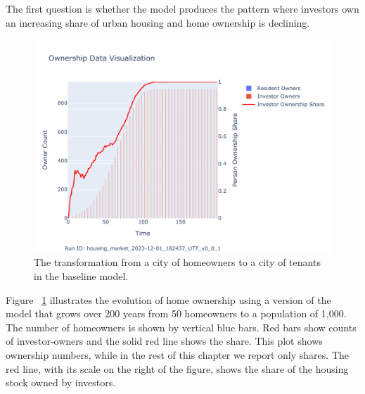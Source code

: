
The first question is whether the model produces the pattern %
where investors own an increasing share of urban housing and home ownership is declining. %

\begin{figure}[h!tb]
\centering
\hspace{4cm} %
\includegraphics[scale=0.8, trim={0 1cm 0 1.8cm}, clip]{fig/Analysis/Ownership_Data_1.pdf}
\caption[The ownership result]{The transformation from a city of homeowners to a city of tenants in the baseline model.}
\label{fig:Baseline_ownership_trajectory}
\end{figure}


Figure ~\ref{fig:Baseline_ownership_trajectory} illustrates the evolution of home ownership using a version of the model that grows over 200 years from 50 homeowners to a population of 1,000. The number of homeowners is shown by vertical blue bars.  Red bars show counts of investor-owners and the solid red line shows the share. This plot shows ownership numbers, while in the rest of this chapter we report only shares. %
The red line, with its scale on the right of the figure, shows the share of the housing stock owned by investors. 

